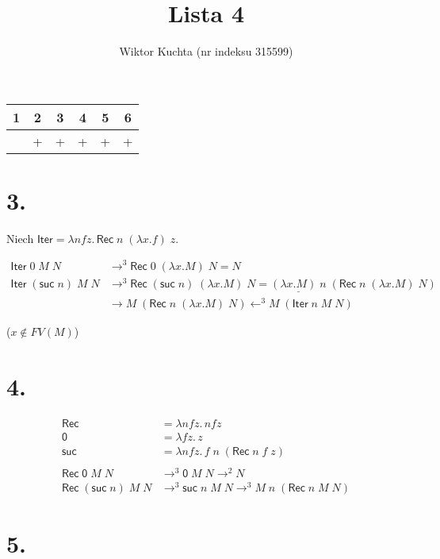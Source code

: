 \documentclass[a4paper, 12pt]{article}
\title{Lista 4}
\author{Wiktor Kuchta (nr indeksu 315599)}
\newcommand{\ul}{\underline}
\newcommand{\+}{\enspace}
\begin{document}
\maketitle

\begin{center}
	\begin{tabular}{ |*{6}{c|} }
	\hline
	1 & 2 & 3 & 4 & 5 & 6 \\
	\hline
	 & + & + & + & + & + \\
	\hline
\end{tabular}
\end{center}

\section*{3.}

Niech $\mathsf{Iter} = λnfz.\,\mathsf{Rec}\;n\;(λx.f)\;z.$


\begin{align*}
	\mathsf{Iter}\;0\;M\;N &\rightarrow^3 \mathsf{Rec}\;0\;(λx.M)\;N = N \\
	\mathsf{Iter}\;(\mathsf{suc}\;n)\;M\;N &\rightarrow^3 \mathsf{Rec}\;(\mathsf{suc}\;n)\;(λx.M)\;N
	= \ul{(λx.M)\;n}\;(\mathsf{Rec}\;n\;(λx.M)\;N) \\
	&\rightarrow M\;(\mathsf{Rec}\;n\;(λx.M)\;N) \leftarrow^3 M\;(\mathsf{Iter}\;n\;M\;N)
\end{align*}

($x \not\in FV(M)$)

\section*{4.}

\begin{align*}
	\mathsf{Rec} &= λnfz.\,nfz \\
	\mathsf{0} &= λfz.\,z \\
	\mathsf{suc} &= λnfz.\,f\;n\;(\mathsf{Rec}\;n\;f\;z)\\ \\
	\mathsf{Rec}\;\mathsf{0}\;M\;N &\rightarrow^3 \mathsf{0}\;M\;N →^2 N \\
	\mathsf{Rec}\;(\mathsf{suc}\;n)\;M\;N &\rightarrow^3 \mathsf{suc}\;n\;M\;N →^3 M\;n\;(\mathsf{Rec}\;n\;M\;N)
\end{align*}

\section*{5.}
\end{document}
